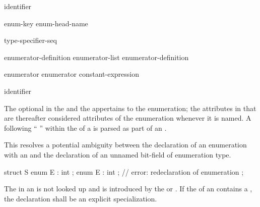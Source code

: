 \begin{bnf}
\br
     identifier
\end{bnf}

\begin{bnf}
\br
    enum-key  enum-head-name  \terminal{;}
\end{bnf}

\begin{bnf}
\br
    \br
     \br
     
\end{bnf}

\begin{bnf}
\br
    \terminal{:} type-specifier-seq
\end{bnf}

\begin{bnf}
\br
    enumerator-definition\br
    enumerator-list \terminal{,} enumerator-definition
\end{bnf}

\begin{bnf}
\br
    enumerator\br
    enumerator \terminal{=} constant-expression
\end{bnf}

\begin{bnf}
\br
    identifier 
\end{bnf}

The optional  in the  and
the  appertains to the enumeration; the attributes
in that  are thereafter considered attributes of the
enumeration whenever it is named.
A \tcode{:} following
``  ''
within the  of a 
is parsed as part of an .
\begin{note}
This resolves a potential ambiguity between the declaration of an enumeration
with an  and the declaration of an unnamed bit-field of enumeration
type.
\begin{example}
\begin{codeblock}
struct S {
  enum E : int {};
  enum E : int {};              // error: redeclaration of enumeration
};
\end{codeblock}

\end{example}
\end{note}
The  in an 
is not looked up and is introduced by
the  or .
If the  of an  contains
a ,
the declaration shall be an explicit specialization.

